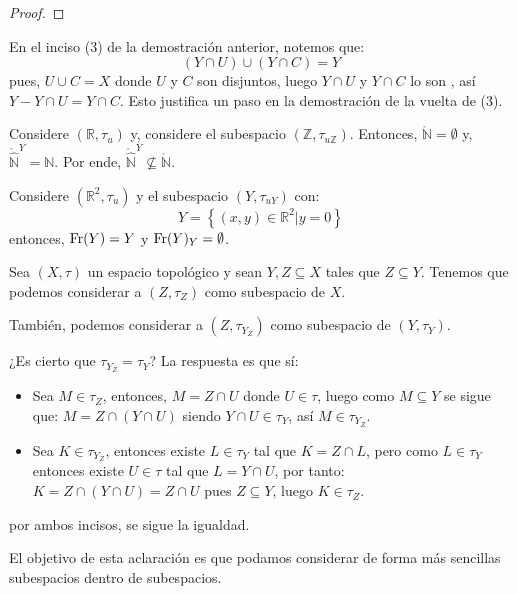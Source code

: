 \documentclass[12pt]{report}
\theoremstyle{largebreak}
\newcommand{\Int}[1]{\ensuremath{\mathring{#1}}}
\newcommand{\Fr}[1]{\ensuremath{\textup{Fr}(#1)}}
\begin{document}
\begin{proof}
    \end{proof}

    \begin{obs}
        En el inciso (3) de la demostración anterior, notemos que:
        \begin{equation*}
            (Y\cap U)\cup (Y\cap C)=Y
        \end{equation*}
        pues, $U\cup C = X$ donde $U$ y $C$ son disjuntos, luego $Y\cap U$ y $Y\cap C$ lo son , así $Y-Y\cap U=Y\cap C$. Esto justifica un paso en la demostración de la vuelta de (3).
    \end{obs}

    \begin{exa}
        Considere $(\mathbb{R},\tau_u)$ y, considere el subespacio $(\mathbb{Z},\tau_{u\mathbb{Z}})$. Entonces, $\Int{\mathbb{N}}=\emptyset$ y, $\Int{\widehat{\mathbb{N}}}^Y=\mathbb{N}$. Por ende, $\Int{\widehat{\mathbb{N}}}^Y\nsubseteq\Int{\mathbb{N}}$.
    \end{exa}

    \begin{exa}
        Considere $(\mathbb{R}^2,\tau_u)$ y el subespacio $(Y,\tau_{uY})$ con:
        \begin{equation*}
            Y=\left\{(x,y)\in\mathbb{R}^2\Big|y=0 \right\}
        \end{equation*}
        entonces, $\Fr{Y}=Y$ y $\Fr{Y}_Y=\emptyset$.
    \end{exa}

    \begin{obs}
        Sea $(X,\tau)$ un espacio topológico y sean $Y,Z\subseteq X$ tales que $Z\subseteq Y$. Tenemos que podemos considerar a $(Z,\tau_Z)$ como subespacio de $X$.

        También, podemos considerar a $(Z,\tau_{Y_Z})$ como subespacio de $(Y,\tau_Y)$.

        ¿Es cierto que $\tau_{Y_Z}=\tau_{Y}$? La respuesta es que sí:
        \begin{itemize}
            \item Sea $M\in\tau_Z$, entonces, $M=Z\cap U$ donde $U\in\tau$, luego como $M\subseteq Y$ se sigue que: $M=Z\cap(Y\cap U)$ siendo $Y\cap U\in\tau_Y$, así $M\in \tau_{Y_Z}$.
            \item Sea $K\in \tau_{Y_Z}$, entonces existe $L\in\tau_Y$ tal que $K=Z\cap L$, pero como $L\in\tau_Y$ entonces existe $U\in\tau$ tal que $L=Y\cap U$, por tanto: $K=Z\cap(Y\cap U)=Z\cap U$ pues $Z\subseteq Y$, luego $K\in\tau_Z$.
        \end{itemize}
        por ambos incisos, se sigue la igualdad.

        El objetivo de esta aclaración es que podamos considerar de forma más sencillas subespacios dentro de subespacios.
    \end{obs}
\end{document}
